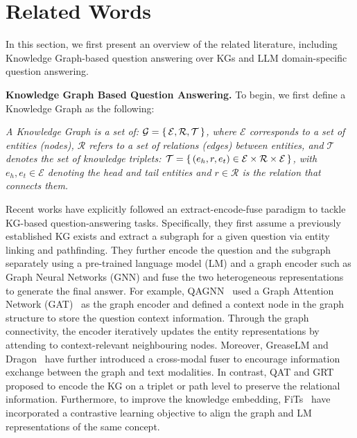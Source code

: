\section*{Related Words}

In this section, we first present an overview of the related literature, including Knowledge Graph-based question answering over KGs and LLM domain-specific question answering.

\textbf{Knowledge Graph Based Question Answering. }
To begin, we first define a Knowledge Graph as the following:
\begin{definition}
    \emph{A Knowledge Graph is a set of: $\mathcal G = \set{\mathcal E, \mathcal R, \mathcal T}$, where $\mathcal E$ corresponds to a set of entities (nodes),
    $\mathcal R$ refers to a set of relations (edges) between entities,
    and $\mathcal T$ denotes the set of knowledge triplets: $\mathcal T = \set{(e_h,r,e_t)\in \mathcal E\times \mathcal R\times \mathcal E}$, with $e_h, e_t \in \mathcal E$ denoting the head and tail entities
    and $r\in\mathcal R$ is the relation that connects them.}
\end{definition}

Recent works have explicitly followed an extract-encode-fuse paradigm to tackle KG-based question-answering tasks.
Specifically, they first assume a previously established KG exists and extract a subgraph for a given question via entity linking and pathfinding. 
They further encode the question and the subgraph separately using a pre-trained language model (LM) and a graph encoder such as Graph Neural Networks (GNN) and fuse the two heterogeneous representations to generate the final answer.
For example, QAGNN~\parencite{qagnn} used a Graph Attention Network (GAT)~\parencite{gat} as the graph encoder and defined a context node in the graph structure to store the question context information. 
Through the graph connectivity, the encoder iteratively updates the entity representations by attending to context-relevant neighbouring nodes.
Moreover, GreaseLM and Dragon~\parencite{greaselm, dragon} have further introduced a cross-modal fuser to encourage information exchange between the graph and text modalities. 
In contrast, QAT and GRT~\parencite{qat, grt} proposed to encode the KG on a triplet or path level to preserve the relational information.
Furthermore, to improve the knowledge embedding, FiTs~\parencite{fits} have incorporated a contrastive learning objective to align the graph and LM representations of the same concept. 

